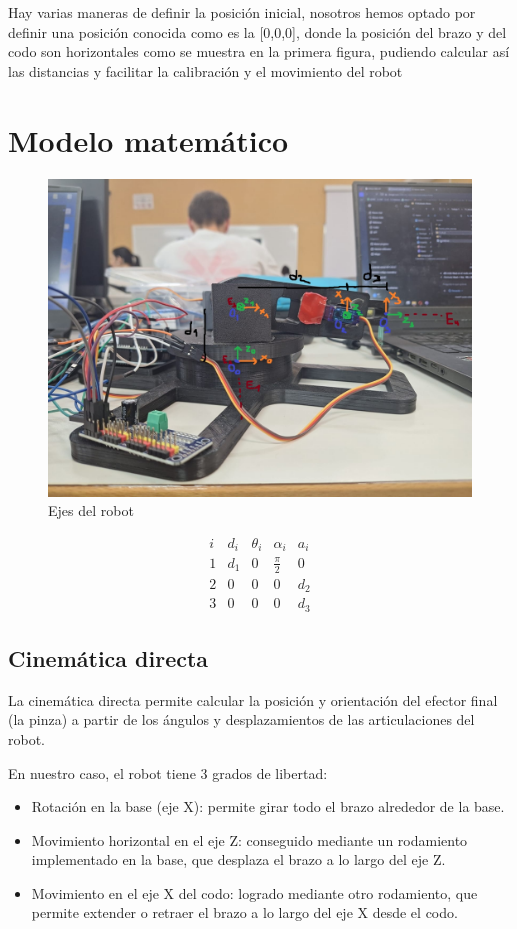 \documentclass[11pt]{article}
\begin{document}
Hay varias maneras de definir la posición inicial, nosotros hemos optado por definir una posición conocida como es la [0,0,0], donde la posición del brazo y del codo son horizontales como se muestra en la primera figura, pudiendo calcular así las distancias y facilitar la calibración y el movimiento del robot

\section{Modelo matemático}
\label{sec:modelo}


\begin{figure}[H]
    \centering
    \includegraphics[width=0.8\linewidth]{figuras/imagen_ejes.jpeg}
    \caption{Ejes del robot}
\end{figure}

\[
\begin{array}{c|c|c|c|c}
i & d_i & \theta_i & \alpha_i & a_i \\ \hline
1 & d_1 & 0 & \tfrac{\pi}{2} & 0 \\
2 & 0 & 0 & 0 & d_2 \\
3 & 0 & 0 & 0 & d_3
\end{array}
\]

\subsection{Cinemática directa}
La cinemática directa permite calcular la posición y orientación del efector final (la pinza) a partir de los ángulos y desplazamientos de las articulaciones del robot.

En nuestro caso, el robot tiene 3 grados de libertad:
\begin{itemize}
    \item Rotación en la base (eje X): permite girar todo el brazo alrededor de la base.
    \item Movimiento horizontal en el eje Z: conseguido mediante un rodamiento implementado en la base, que desplaza el brazo a lo largo del eje Z.
    \item Movimiento en el eje X del codo: logrado mediante otro rodamiento, que permite extender o retraer el brazo a lo largo del eje X desde el codo.

\end{itemize}
\end{document}
